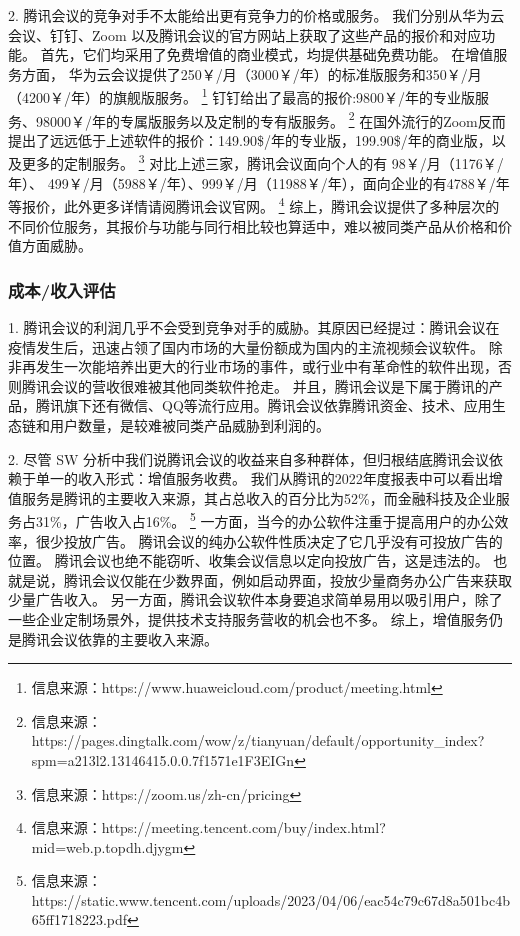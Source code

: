 \documentclass[a4paper,12pt]{article}
\begin{document}
    2.
    腾讯会议的竞争对手不太能给出更有竞争力的价格或服务。
    我们分别从华为云会议、钉钉、Zoom 以及腾讯会议的官方网站上获取了这些产品的报价和对应功能。
    首先，它们均采用了免费增值的商业模式，均提供基础免费功能。
    在增值服务方面，
    华为云会议提供了250￥/月（3000￥/年）的标准版服务和350￥/月（4200￥/年）的旗舰版服务。
    \footnote{信息来源：https://www.huaweicloud.com/product/meeting.html}
    钉钉给出了最高的报价:9800￥/年的专业版服务、98000￥/年的专属版服务以及定制的专有版服务。
    \footnote{信息来源：https://pages.dingtalk.com/wow/z/tianyuan/default/opportunity\_index?spm=a213l2.13146415.0.0.7f1571e1F3EIGn}
    在国外流行的Zoom反而提出了远远低于上述软件的报价：149.90\$/年的专业版，199.90\$/年的商业版，以及更多的定制服务。
    \footnote{信息来源：https://zoom.us/zh-cn/pricing}
    对比上述三家，腾讯会议面向个人的有 98￥/月（1176￥/年）、 499￥/月（5988￥/年）、999￥/月（11988￥/年），面向企业的有4788￥/年等报价，此外更多详情请阅腾讯会议官网。
    \footnote{信息来源：https://meeting.tencent.com/buy/index.html?mid=web.p.topdh.djygm}
    综上，腾讯会议提供了多种层次的不同价位服务，其报价与功能与同行相比较也算适中，难以被同类产品从价格和价值方面威胁。


    \subsubsection{成本/收入评估}
    1.
    腾讯会议的利润几乎不会受到竞争对手的威胁。其原因已经提过：腾讯会议在疫情发生后，迅速占领了国内市场的大量份额成为国内的主流视频会议软件。
    除非再发生一次能培养出更大的行业市场的事件，或行业中有革命性的软件出现，否则腾讯会议的营收很难被其他同类软件抢走。
    并且，腾讯会议是下属于腾讯的产品，腾讯旗下还有微信、QQ等流行应用。腾讯会议依靠腾讯资金、技术、应用生态链和用户数量，是较难被同类产品威胁到利润的。


    2.
    尽管 SW 分析中我们说腾讯会议的收益来自多种群体，但归根结底腾讯会议依赖于单一的收入形式：增值服务收费。
    我们从腾讯的2022年度报表中可以看出增值服务是腾讯的主要收入来源，其占总收入的百分比为52\%，而金融科技及企业服务占31\%，广告收入占16\%。
    \footnote{信息来源：https://static.www.tencent.com/uploads/2023/04/06/eac54c79c67d8a501bc4b65ff1718223.pdf}
    一方面，当今的办公软件注重于提高用户的办公效率，很少投放广告。
    腾讯会议的纯办公软件性质决定了它几乎没有可投放广告的位置。
    腾讯会议也绝不能窃听、收集会议信息以定向投放广告，这是违法的。
    也就是说，腾讯会议仅能在少数界面，例如启动界面，投放少量商务办公广告来获取少量广告收入。
    另一方面，腾讯会议软件本身要追求简单易用以吸引用户，除了一些企业定制场景外，提供技术支持服务营收的机会也不多。
    综上，增值服务仍是腾讯会议依靠的主要收入来源。
\end{document}
